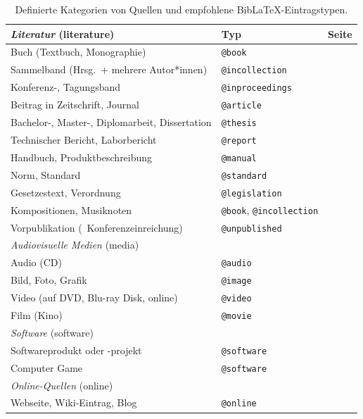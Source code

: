 \begin{table}
\caption{Definierte Kategorien von Quellen und empfohlene BibLaTeX-Eintragstypen.}
\label{tab:QuellenUndEintragstypen}
\centering
\begin{tabular}{@{}llc@{}}
	\toprule
	\emph{Literatur} (\textsf{literature}) & Typ & Seite\\
	\midrule
	Buch (Textbuch, Monographie) & \texttt{@book} & \pageref{sec:@book}\\
	Sammelband (Hrsg.\ + mehrere Autor*innen) & \texttt{@incollection} & \pageref{sec:@incollection} \\
	Konferenz-, Tagungsband & \texttt{@inproceedings} & \pageref{sec:@inproceedings}\\
	Beitrag in Zeitschrift, Journal & \texttt{@article} & \pageref{sec:@article}\\
	Bachelor-, Master-, Diplomarbeit, Dissertation & \texttt{@thesis} & \pageref{sec:@thesis}\\
	Technischer Bericht, Laborbericht & \texttt{@report} & \pageref{sec:@report}\\
	Handbuch, Produktbeschreibung & \texttt{@manual} & \pageref{sec:@manual}\\
	Norm, Standard & \texttt{@standard} & \pageref{sec:@standard}\\
	Gesetzestext, Verordnung \etc & \texttt{@legislation} & \pageref{sec:@legislation}\\
	Kompositionen, Musiknoten & \texttt{@book}, \texttt{@incollection} & \pageref{sec:Musiknoten}\\
	Vorpublikation (\zB\ Konferenzeinreichung) & \texttt{@unpublished} & \pageref{sec:@unpublished}\\
	\addlinespace
%
	\midrule
	\emph{Audiovisuelle Medien} (\textsf{media}) & & \\
	\midrule
	Audio (CD) & \texttt{@audio} & \pageref{sec:@audio}\\
	Bild, Foto, Grafik & \texttt{@image} & \pageref{sec:@image}\\
	Video (auf DVD, Blu-ray Disk, online) & \texttt{@video} & \pageref{sec:@video}\\
	Film (Kino) & \texttt{@movie} & \pageref{sec:@movie}\\
	\addlinespace
%
	\midrule
	\emph{Software} (\textsf{software}) & & \\
	\midrule
	Softwareprodukt oder -projekt & \texttt{@software} & \pageref{sec:@software}\\
	Computer Game & \texttt{@software} & \pageref{sec:@software}\\
	\addlinespace
%
	\midrule
	\emph{Online-Quellen} (\textsf{online}) & & \\
	\midrule
	Webseite, Wiki-Eintrag, Blog \etc & \texttt{@online} & \pageref{sec:@online-www} \\
	\bottomrule
\end{tabular}
\end{table}

